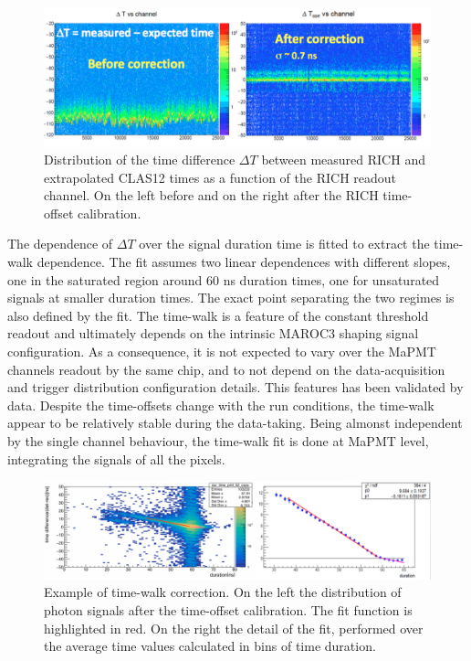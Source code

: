 \documentclass[final,5p,times,twocolumn]{elsarticle}
\def\MAPMT{MaPMT }
\def\dT{$\Delta T$ }
\begin{document}
\begin{figure}[t]
\begin{center}
\includegraphics[width=1.0\columnwidth]{EPS/Time_correction.png}
\end{center}
\caption{Distribution of the time difference \dT between measured RICH and extrapolated CLAS12 times as a function 
of the RICH readout channel. On the left before and on the right after the RICH time-offset calibration.}
\label{Fig:TimeOff}
\end{figure}

The dependence of \dT over the signal duration time is fitted to extract the time-walk dependence. The fit
assumes two linear dependences with different slopes, one in the saturated region around 60 ns duration times, 
one for unsaturated signals at smaller duration times. The exact point separating the two regimes is also
defined by the fit. The time-walk is a feature of the constant threshold readout and ultimately depends
on the intrinsic MAROC3 shaping signal configuration. As a consequence, it is not expected to vary over the 
\MAPMT channels readout by the same chip, and to not depend on the data-acquisition and trigger 
distribution configuration details. This features has been validated by data. Despite the time-offsets change with
the run conditions, the time-walk appear to be relatively stable during the data-taking. Being almonst independent
by the single channel behaviour, the time-walk fit is done at \MAPMT level, integrating the signals of all
the pixels.

\begin{figure}[t]
\begin{center}
\includegraphics[width=1.0\columnwidth]{EPS/Time_walk_corr.png}
\end{center}
\caption{Example of time-walk correction. On the left the distribution of photon signals after the time-offset
calibration. The fit function is highlighted in red. On the right the detail of the fit, performed over the
average time values calculated in bins of time duration.}
\label{Fig:TimeOff}
\end{figure}
\end{document}
